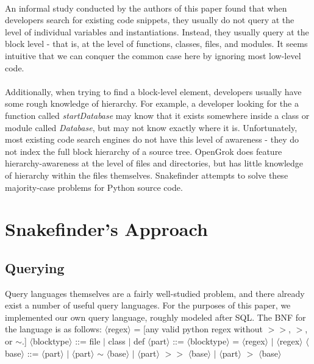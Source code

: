 \documentclass{article}
\begin{document}
\paragraph{}
An informal study conducted by the authors of this paper found that when developers search for existing code snippets, they usually do not query at the level of individual variables and instantiations. Instead, they usually query at the block level - that is, at the level of functions, classes, files, and modules. It seems intuitive that we can conquer the common case here by ignoring most low-level code.

\paragraph{}
Additionally, when trying to find a block-level element, developers usually have some rough knowledge of hierarchy. For example, a developer looking for the a function called \emph{startDatabase} may know that it exists somewhere inside a class or module called \emph{Database}, but may not know exactly where it is. Unfortunately, most existing code search engines do not have this level of awareness - they do not index the full block hierarchy of a source tree. OpenGrok does feature hierarchy-awareness at the level of files and directories, but has little knowledge of hierarchy within the files themselves. Snakefinder attempts to solve these majority-case problems for Python source code.

\section{Snakefinder's Approach}
\subsection{Querying}
Query languages themselves are a fairly well-studied problem, and there already exist a number of useful query languages. For the purposes of this paper, we implemented our own query language, roughly modeled after SQL. The BNF\cite{BNF} for the language is as follows:\newline
\newline
$\langle$regex$\rangle$ = [any valid python regex without $>>$, $>$, or $\sim$.]
\newline
$\langle$blocktype$\rangle$ ::= file $|$ class $|$ def
\newline
$\langle$part$\rangle$ ::= $\langle$blocktype$\rangle$ = $\langle$regex$\rangle$ $|$ $\langle$regex$\rangle$
\newline
$\langle$base$\rangle$ ::= $\langle$part$\rangle$ $|$ $\langle$part$\rangle$ $\sim$ $\langle$base$\rangle$ $|$ $\langle$part$\rangle$ $>>$ $\langle$base$\rangle$ $|$ $\langle$part$\rangle$ $>$ $\langle$base$\rangle$
\newline
\end{document}
